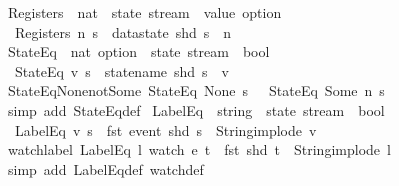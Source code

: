 \begin{isabellebody}
\isanewline
{}\isamarkupfalse%
\ Registers\ {\isacharcolon}{\isacharcolon}\ {\isachardoublequoteopen}nat\ {\isasymRightarrow}\ state\ stream\ {\isasymRightarrow}\ value\ option{\isachardoublequoteclose}\ \isanewline
\ \ {\isachardoublequoteopen}Registers\ n\ s\ {\isasymequiv}\ datastate\ {\isacharparenleft}shd\ s{\isacharparenright}\ {\isachardollar}\ n{\isachardoublequoteclose}\isanewline
\isanewline
{}\isamarkupfalse%
\ StateEq\ {\isacharcolon}{\isacharcolon}\ {\isachardoublequoteopen}nat\ option\ {\isasymRightarrow}\ state\ stream\ {\isasymRightarrow}\ bool{\isachardoublequoteclose}\ \isanewline
\ \ {\isachardoublequoteopen}StateEq\ v\ s\ {\isasymequiv}\ statename\ {\isacharparenleft}shd\ s{\isacharparenright}\ {\isacharequal}\ v{\isachardoublequoteclose}\isanewline
\isanewline
{}\isamarkupfalse%
\ StateEq{\isacharunderscore}None{\isacharunderscore}not{\isacharunderscore}Some{\isacharcolon}\ {\isachardoublequoteopen}StateEq\ None\ s\ {\isasymLongrightarrow}\ {\isasymnot}\ StateEq\ {\isacharparenleft}Some\ n{\isacharparenright}\ s{\isachardoublequoteclose}\isanewline
%
\isadelimproof
\ \ %
\endisadelimproof
%
\isatagproof
{}\isamarkupfalse%
\ {\isacharparenleft}simp\ add{\isacharcolon}\ StateEq{\isacharunderscore}def{\isacharparenright}%
\endisatagproof
{\isafoldproof}%
%
\isadelimproof
\isanewline
%
\endisadelimproof
\isanewline
{}\isamarkupfalse%
\ LabelEq\ {\isacharcolon}{\isacharcolon}\ {\isachardoublequoteopen}string\ {\isasymRightarrow}\ state\ stream\ {\isasymRightarrow}\ bool{\isachardoublequoteclose}\ \isanewline
\ \ {\isachardoublequoteopen}LabelEq\ v\ s\ {\isasymequiv}\ fst\ {\isacharparenleft}event\ {\isacharparenleft}shd\ s{\isacharparenright}{\isacharparenright}\ {\isacharequal}\ {\isacharparenleft}String{\isachardot}implode\ v{\isacharparenright}{\isachardoublequoteclose}\isanewline
\isanewline
{}\isamarkupfalse%
\ watch{\isacharunderscore}label{\isacharcolon}\ {\isachardoublequoteopen}LabelEq\ l\ {\isacharparenleft}watch\ e\ t{\isacharparenright}\ {\isacharequal}\ {\isacharparenleft}fst\ {\isacharparenleft}shd\ t{\isacharparenright}\ {\isacharequal}\ String{\isachardot}implode\ l{\isacharparenright}{\isachardoublequoteclose}\isanewline
%
\isadelimproof
\ \ %
\endisadelimproof
%
\isatagproof
{}\isamarkupfalse%
\ {\isacharparenleft}simp\ add{\isacharcolon}\ LabelEq{\isacharunderscore}def\ watch{\isacharunderscore}def{\isacharparenright}%
\endisatagproof
{\isafoldproof}%

\end{isabellebody}
